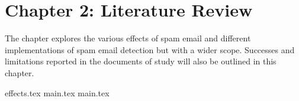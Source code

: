 \section{Chapter 2: Literature Review}
The chapter explores the various effects of spam email and different implementations of spam email detection but with a wider scope. Successes and limitations reported in the documents of study will also be outlined in this chapter.

{effects.tex}
{main.tex}
{main.tex}